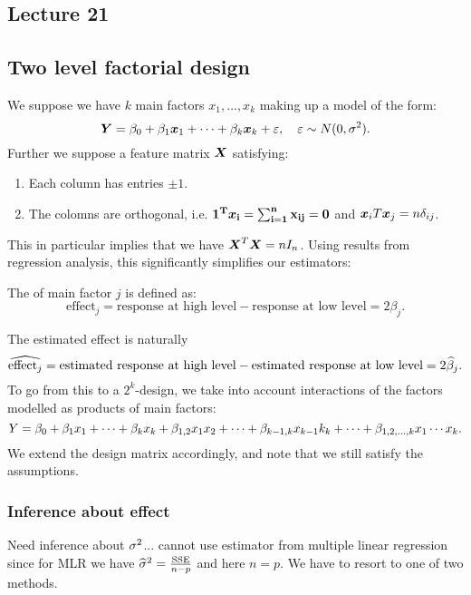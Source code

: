 \subsection*{Lecture  21}
\subsection{Two level factorial design}

We suppose we have $k$ main factors $x_1,\dots,x_k$ making up a model of the form:
$$
    \boldsymbol{Y}=\beta_0 + \beta_1\boldsymbol{x}_1+\dots+\beta_k\boldsymbol{x}_k + \varepsilon, \quad \varepsilon\sim N(0, \sigma^2).
$$ 
Further we suppose a feature matrix $\boldsymbol{X}$ satisfying:
\begin{enumerate}
    \item Each column has entries $\pm 1$.
    \item The colomns are orthogonal, i.e. $\bf{1}^T\boldsymbol{x}_i=\sum_{i=1}^n x_{ij}=0$ and $\boldsymbol{x}_iT\boldsymbol{x}_j=n\delta_{ij}$. 
\end{enumerate}

This in particular implies that we have $\boldsymbol{X}^T \boldsymbol{X} = n I_n$. Using results from regression analysis, this significantly simplifies our estimators:


\begin{definition}
    The  of main factor $j$ is defined as:
    $$
        \textrm{effect}_j = \textrm{response at high level} - \textrm{response at low level} = 2\beta_j.
    $$
\end{definition}
The estimated effect is naturally
$$
    \widehat{\textrm{effect}_j} = \textrm{estimated response at high level} - \textrm{estimated response at low level} = 2\widehat{\beta}_j.
$$
To go from this to a $2^k$-design, we take into account interactions of the factors modelled as products of main factors:
$$
    Y = \beta_0 + \beta_1x_1+\dots+\beta_kx_k + \beta_{1,2}x_1x_2 + \dots+\beta_{k-1,k}x_{k-1}k_{k}+\dots+\beta_{1,2,\dots,k}x_1\cdots x_k.
$$
We extend the design matrix accordingly, and note that we still satisfy the assumptions. 


\subsubsection{Inference about effect}

Need inference about $\sigma^2$... cannot use estimator from multiple linear regression since for MLR we have $\widehat{\sigma}^2=\frac{\textrm{SSE}}{n-p}$ and here $n=p$. We have to resort to one of two methods.

